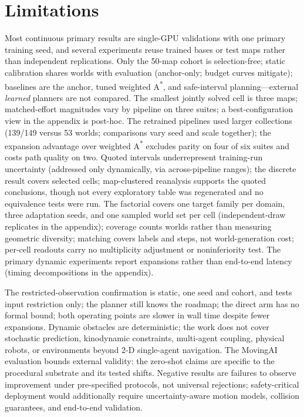 \documentclass[letterpaper]{article} %
\begin{document}
\section{Limitations}

Most continuous primary results are single-GPU validations with one primary training seed, and several experiments reuse trained bases or test maps rather than independent replications. Only the 50-map cohort is selection-free; static calibration shares worlds with evaluation (anchor-only; budget curves mitigate); baselines are the anchor, tuned weighted A\textsuperscript{*}, and safe-interval planning---external \emph{learned} planners are not compared. The smallest jointly solved cell is three maps; matched-effort magnitudes vary by pipeline on three suites; a best-configuration view in the appendix is post-hoc. The retrained pipelines used larger collections (139/149 versus 53 worlds; comparisons vary seed and scale together); the expansion advantage over weighted A\textsuperscript{*} excludes parity on four of six suites and costs path quality on two. Quoted intervals underrepresent training-run uncertainty (addressed only dynamically, via across-pipeline ranges); the discrete result covers selected cells; map-clustered reanalysis supports the quoted conclusions, though not every exploratory table was regenerated and no equivalence tests were run. The factorial covers one target family per domain, three adaptation seeds, and one sampled world set per cell (independent-draw replicates in the appendix); coverage counts worlds rather than measuring geometric diversity; matching covers labels and steps, not world-generation cost; per-cell readouts carry no multiplicity adjustment or noninferiority test. The primary dynamic experiments report expansions rather than end-to-end latency (timing decompositions in the appendix).

The restricted-observation confirmation is static, one seed and cohort, and tests input restriction only; the planner still knows the roadmap; the direct arm has no formal bound; both operating points are slower in wall time despite fewer expansions. Dynamic obstacles are deterministic; the work does not cover stochastic prediction, kinodynamic constraints, multi-agent coupling, physical robots, or environments beyond 2-D single-agent navigation. The MovingAI evaluation bounds external validity: the zero-shot claims are specific to the procedural substrate and its tested shifts. Negative results are failures to observe improvement under pre-specified protocols, not universal rejections; safety-critical deployment would additionally require uncertainty-aware motion models, collision guarantees, and end-to-end validation.
\end{document}

